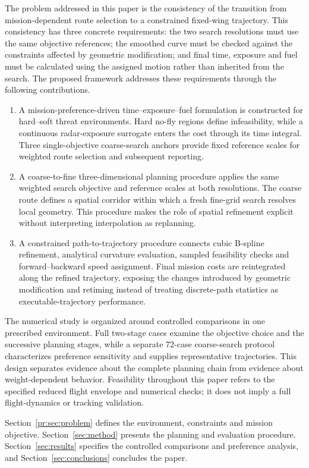 The problem addressed in this paper is the consistency of the transition
from mission-dependent route selection to a constrained fixed-wing
trajectory. This consistency has three concrete requirements: the two
search resolutions must use the same objective references; the smoothed
curve must be checked against the constraints affected by geometric
modification; and final time, exposure and fuel must be calculated using
the assigned motion rather than inherited from the search. The proposed
framework addresses these requirements through the following contributions.

\begin{enumerate}
\item A mission-preference-driven time--exposure--fuel formulation is
constructed for hard--soft threat environments. Hard no-fly regions define
infeasibility, while a continuous radar-exposure surrogate enters the cost
through its time integral. Three single-objective coarse-search anchors
provide fixed reference scales for weighted route selection and subsequent
reporting.

\item A coarse-to-fine three-dimensional planning procedure applies the
same weighted search objective and reference scales at both resolutions.
The coarse route defines a spatial corridor within which a fresh fine-grid
search resolves local geometry. This procedure makes the role of spatial
refinement explicit without interpreting interpolation as replanning.

\item A constrained path-to-trajectory procedure connects cubic B-spline
refinement, analytical curvature evaluation, sampled feasibility checks
and forward--backward speed assignment. Final mission costs are
reintegrated along the refined trajectory, exposing the changes introduced
by geometric modification and retiming instead of treating discrete-path
statistics as executable-trajectory performance.
\end{enumerate}

The numerical study is organized around controlled comparisons in one
prescribed environment. Full two-stage cases examine the objective choice
and the successive planning stages, while a separate 72-case coarse-search
protocol characterizes preference sensitivity and supplies representative
trajectories. This design separates evidence about the complete planning
chain from evidence about weight-dependent behavior. Feasibility throughout
this paper refers to the specified reduced flight envelope and numerical
checks; it does not imply a full flight-dynamics or tracking validation.

Section~\ref{pr:sec:problem} defines the environment, constraints and mission
objective. Section~\ref{sec:method} presents the planning and evaluation
procedure. Section~\ref{sec:results} specifies the controlled comparisons
and preference analysis, and Section~\ref{sec:conclusions} concludes the paper.
